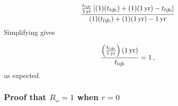 \begin{equation}
  \frac{\frac{\tlife}{\oneyr}
              \left[ (1) (\tlife) + 
                     (1) (\oneyr) - 
                     \tlife
              \right]}
       {(1) (\tlife) + 
        (1) (\oneyr) - 
        \oneyr}
\end{equation}
%
Simplifying gives

\begin{equation}
  \frac{\left( \frac{t_{li\!f\!e}}{1\,\mathrm{yr}} \right) (1\,\mathrm{yr})}{t_{li\!f\!e}} = 1 \, ,
\end{equation}
%
as expected.



\subsubsection{Proof that $R_\omega = 1$ when $r = 0$}
